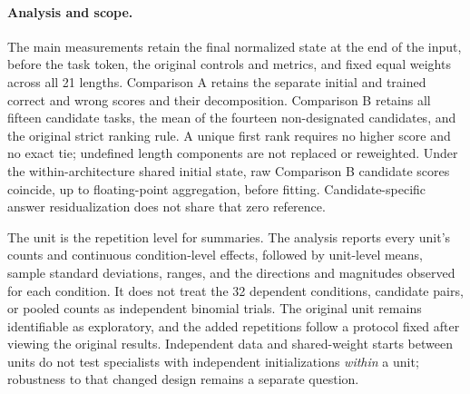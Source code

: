 \paragraph{Analysis and scope.}
The main measurements retain the final normalized state at the end of the
input, before the task token, the original controls and metrics, and fixed
equal weights across all 21 lengths. Comparison A retains the separate
initial and trained correct and wrong scores and their decomposition.
Comparison B retains all fifteen candidate tasks, the mean of the fourteen
non-designated candidates, and the original strict ranking rule. A unique
first rank requires no higher score and no exact tie; undefined length
components are not replaced or reweighted. Under the within-architecture
shared initial state, raw Comparison B candidate scores coincide, up to
floating-point aggregation, before fitting. Candidate-specific answer
residualization does not share that zero reference.

The unit is the repetition level for summaries. The analysis reports every
unit's counts and continuous condition-level effects, followed by unit-level
means, sample standard deviations, ranges, and the directions and magnitudes
observed for each condition. It does not treat the 32 dependent conditions,
candidate pairs, or pooled counts as independent binomial trials. The
original unit remains identifiable as exploratory, and the added repetitions
follow a protocol fixed after viewing the original results. Independent
data and shared-weight starts between units do not test specialists with
independent initializations \emph{within} a unit; robustness to that changed
design remains a separate question.
